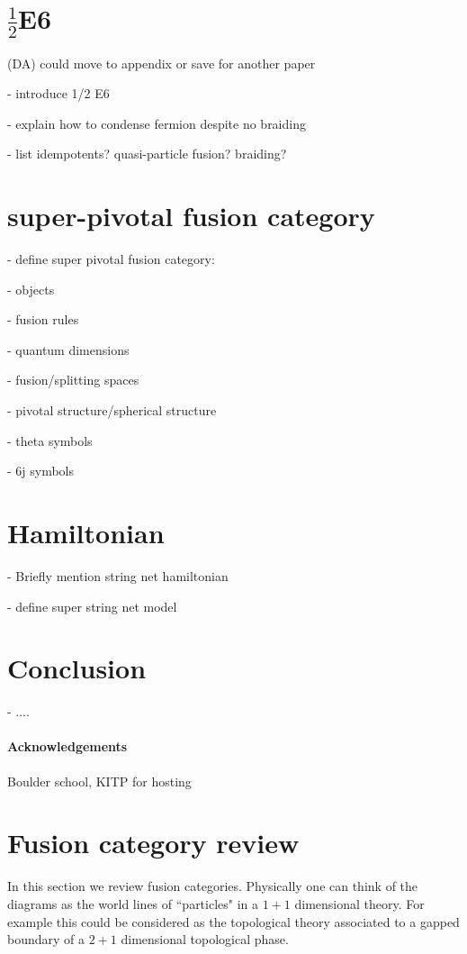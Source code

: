 \documentclass[11pt]{article}
\newcommand{\dave}[1]{{\color{ao(english)}\footnotesize{(DA) #1}}}
\numberwithin{equation}{section}
\begin{document}
\section{$\frac{1}{2}$E6}

\dave{could move to appendix or save for another paper}

- introduce 1/2 E6

- explain how to condense fermion despite no braiding

- list idempotents? quasi-particle fusion? braiding? 

\section{super-pivotal fusion category}

- define super pivotal fusion category:

- objects

- fusion rules

- quantum dimensions

- fusion/splitting spaces

- pivotal structure/spherical structure

- theta symbols

- 6j symbols


 
 \section{Hamiltonian}
 
 - Briefly mention string net hamiltonian
 
 - define super string net model 
 
 \section{Conclusion}
 - ....
 \paragraph{Acknowledgements}
 Boulder school, KITP for hosting
 
 

{}




\clearpage
\appendix
\section{Fusion category review}
In this section we review fusion categories. 
Physically one can think of the diagrams as the world lines of ``particles" in a $1+1$ dimensional theory.
For example this could be considered as the topological theory associated to a gapped boundary of a $2+1$ dimensional topological phase. 
\end{document}
